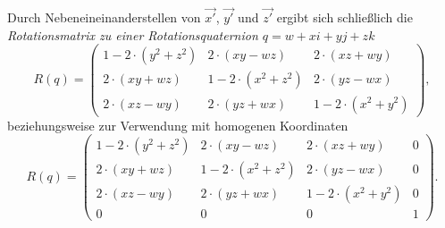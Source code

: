 Durch Nebeneineinanderstellen von $\vec{x'}$, $\vec{y'}$ und $\vec{z'}$ ergibt sich schließlich die \emph{Rotationsmatrix zu einer Rotationsquaternion $q = w + xi + yj + zk$}
\begin{equation}
 R(q) =
 \begin{pmatrix}
  1 - 2 \cdot ( y^2 + z^2 ) & 2 \cdot ( xy - wz ) & 2 \cdot ( xz + wy ) \\
  2 \cdot ( xy + wz ) & 1 - 2 \cdot ( x^2 + z^2 ) & 2 \cdot ( yz - wx ) \\
  2 \cdot ( xz - wy ) & 2 \cdot ( yz + wx ) & 1 - 2 \cdot ( x^2 + y^2 )
 \end{pmatrix},
\end{equation}
beziehungsweise zur Verwendung mit homogenen Koordinaten
\begin{equation}
 R(q) =
 \begin{pmatrix}
  1 - 2 \cdot ( y^2 + z^2 ) & 2 \cdot ( xy - wz ) & 2 \cdot ( xz + wy ) & 0 \\
  2 \cdot ( xy + wz ) & 1 - 2 \cdot ( x^2 + z^2 ) & 2 \cdot ( yz - wx ) & 0 \\
  2 \cdot ( xz - wy ) & 2 \cdot ( yz + wx ) & 1 - 2 \cdot ( x^2 + y^2 ) & 0 \\
  0 & 0 & 0 & 1
 \end{pmatrix}.
\end{equation}

